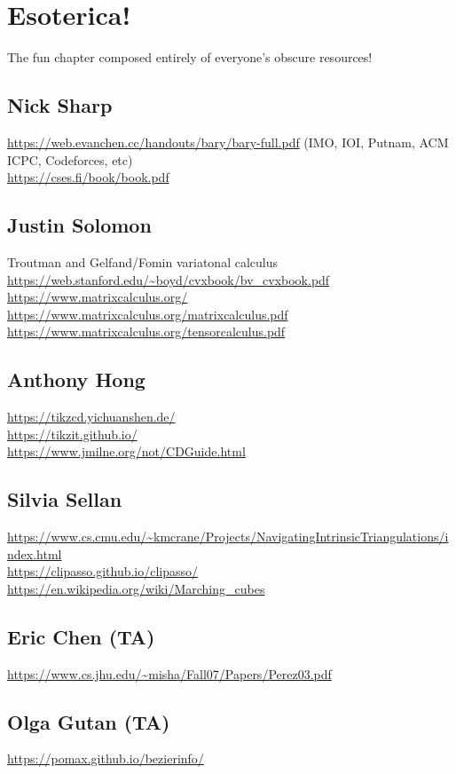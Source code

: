 \chapter{Esoterica!}

The fun chapter composed entirely of everyone's obscure resources!

\section*{Nick Sharp}
\url{https://web.evanchen.cc/handouts/bary/bary-full.pdf}
(IMO, IOI, Putnam, ACM ICPC, Codeforces, etc)\\
\url{https://cses.fi/book/book.pdf}

\section*{Justin Solomon}
Troutman and Gelfand/Fomin variatonal calculus\\
\url{https://web.stanford.edu/~boyd/cvxbook/bv_cvxbook.pdf}\\
\url{https://www.matrixcalculus.org/}\\
\url{https://www.matrixcalculus.org/matrixcalculus.pdf}\\
\url{https://www.matrixcalculus.org/tensorcalculus.pdf}

\section*{Anthony Hong}
\url{https://tikzcd.yichuanshen.de/}\\
\url{https://tikzit.github.io/}\\
\url{https://www.jmilne.org/not/CDGuide.html}
\section*{Silvia Sellan}
\url{https://www.cs.cmu.edu/~kmcrane/Projects/NavigatingIntrinsicTriangulations/index.html}\\
\url{https://clipasso.github.io/clipasso/ } \\
\url{https://en.wikipedia.org/wiki/Marching_cubes} 
\section*{Eric Chen (TA)}
\url{https://www.cs.jhu.edu/~misha/Fall07/Papers/Perez03.pdf}
\section*{Olga Gutan (TA)}
\url{https://pomax.github.io/bezierinfo/ }